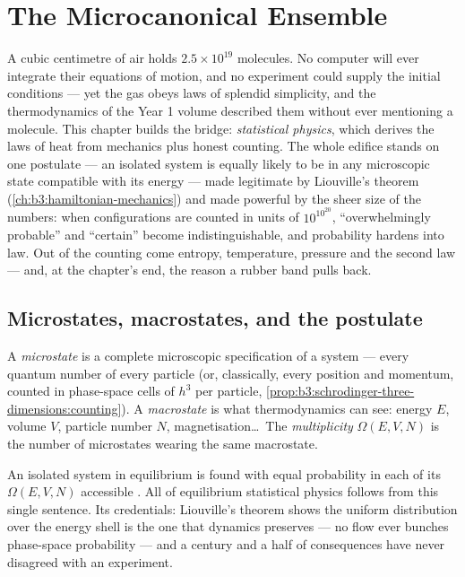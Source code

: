 \chapter{The Microcanonical Ensemble}\label{ch:b3:microcanonical-ensemble}

A cubic centimetre of air holds $2.5\times10^{19}$ molecules. No
computer will ever integrate their equations of motion, and no
experiment could supply the initial conditions --- yet the gas obeys
laws of splendid simplicity, and the thermodynamics of the Year 1
volume described them without ever mentioning a molecule. This
chapter builds the bridge: \emph{statistical physics}, which derives
the laws of heat from mechanics plus honest counting. The whole
edifice stands on one postulate --- an isolated system is equally
likely to be in any microscopic state compatible with its energy ---
made legitimate by Liouville's theorem
(\cref{ch:b3:hamiltonian-mechanics}) and made powerful by the sheer
size of the numbers: when configurations are counted in units of
$10^{10^{20}}$, ``overwhelmingly probable'' and ``certain'' become
indistinguishable, and probability hardens into law. Out of the
counting come entropy, temperature, pressure and the second law ---
and, at the chapter's end, the reason a rubber band pulls back.

\section{Microstates, macrostates, and the postulate}

\begin{definition}\label{def:b3:microcanonical-ensemble:states}
A \emph{microstate} is a complete microscopic specification of a
system --- every quantum number of every particle (or, classically,
every position and momentum, counted in phase-space cells of $h^3$
per particle, \cref{prop:b3:schrodinger-three-dimensions:counting}).
A \emph{macrostate} is what thermodynamics can see: energy $E$,
volume $V$, particle number $N$, magnetisation\dots\ The
\emph{multiplicity} $\Omega(E, V, N)$ is the number of microstates
wearing the same macrostate.
\end{definition}

\begin{theorem}\label{thm:b3:microcanonical-ensemble:postulate}
An isolated system in equilibrium is found with equal probability in
each of its $\Omega(E, V, N)$ accessible . All of
equilibrium statistical physics follows from this single sentence.
Its credentials: Liouville's theorem shows the uniform distribution
over the energy shell is the one that dynamics preserves --- no flow
ever bunches phase-space probability --- and a century and a half of
consequences have never disagreed with an experiment.
\end{theorem}
\admitted

